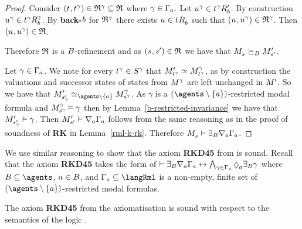 \begin{proof}
Consider $(\kStateT, \kStateT[\gamma]) \in \refinement^\gamma \subseteq \refinement$ where $\gamma \in \Gamma_\agentA$.
Let $\kStateU[\gamma] \in \kSuccessorsPB{\kStateT[\gamma]}$.
By construction $\kStateU[\gamma] \in \kSuccessorsB[\gamma]{\kStateT[\gamma]}$.
By {\bf back-$\agentB$} for $\refinement^\gamma$ there exists $\kStateU \in \kSuccessorsB{\kStateT}$ such that $(\kStateU, \kStateU[\gamma]) \in \refinement^\gamma$.
Then $(\kStateU, \kStateU[\gamma]) \in \refinement$.

Therefore $\refinement$ is a $\agentsB$-refinement and as $(\kStateS, \kStateSP) \in \refinement$ we have that $\kPModel{\kStateS} \simulatesBs \kPModelP{\kStateSP}$.

Let $\gamma \in \Gamma_\agentA$.
We note for every $\kStateT[\gamma] \in \kStates[\gamma]$ that $\kPModelP{\kStateT[\gamma]} \bisimilar \kPModel[\gamma]{\kStateT[\gamma]}$, as by construction the valuations and successor states of states from $\kModel[\gamma]$ are left unchanged in $\kModelP$.
So we have that $\kPModelP{\kStateSP_\gamma} \bisimilar[\agents \setminus \{\agentA\}] \kPModel[\gamma]{\kStateS[\gamma]}$.
As $\gamma$ is a $(\agents \setminus \{\agentA\})$-restricted modal formula and $\kPModel[\gamma]{\kStateS[\gamma]} \entails \gamma$ then by Lemma~\ref{b-restricted-invariance} we have that $\kPModelP{\kStateSP_\gamma} \entails \gamma$.
Then $\kPModelP{\kStateSP} \entails \coversA \Gamma_\agentA$ follows from the same reasoning as in the proof of soundness of {\bf RK} in Lemma~\ref{rml-k-rk}.
Therefore $\kPModel{\kStateS} \entails \somerefsBs \coversA \Gamma_\agentA$.
\end{proof}

We use similar reasoning to show that the axiom {\bf RKD45} from \axiomRmlKD{} is sound.
Recall that the axiom {\bf RKD45} takes the form of $\proves \somerefsBs \coversA \Gamma_\agentA \iff \bigwedge_{\gamma \in \Gamma_\agentA} \possibleA \somerefsBs \gamma$ where $\agentsB \subseteq \agents$, $\agentA \in \agentsB$, and $\Gamma_\agentA \subseteq \langRml$ is a non-empty, finite set of $(\agents \setminus \{\agentA\})$-restricted modal formulas.

\begin{lemma}\label{rml-kd45-rkd45}
The axiom {\bf RKD45} from the axiomatisation \axiomRmlKD{} is sound with respect to the semantics of the logic \logicRmlKD{}.
\end{lemma}

